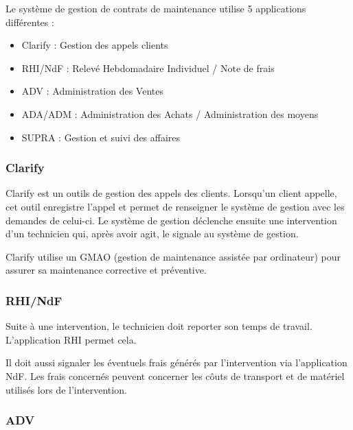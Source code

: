 Le système de gestion de contrats de maintenance utilise 5 applications différentes :


\begin{itemize}
\item Clarify : Gestion des appels clients
\item RHI/NdF : Relevé Hebdomadaire Individuel / Note de frais
\item ADV : Administration des Ventes
\item ADA/ADM : Administration des Achats / Administration des moyens
\item SUPRA : Gestion et suivi des affaires
\end{itemize}


\subsubsection{Clarify}

Clarify est un outils de gestion des appels des clients.
Lorsqu'un client appelle, cet outil enregistre l'appel et permet de renseigner le système de gestion avec les demandes de celui-ci.
Le système de gestion déclenche ensuite une intervention d'un technicien qui, après avoir agit, le signale au système de gestion.

Clarify utilise un GMAO (gestion de maintenance assistée par ordinateur) pour assurer sa maintenance corrective et préventive.


\subsubsection{RHI/NdF}

Suite à une intervention, le technicien doit reporter son temps de travail. L'application RHI permet cela.

Il doit aussi signaler les éventuels frais générés par l'intervention via l'application NdF.
Les frais concernés peuvent concerner les côuts de transport et de matériel utilisés lors de l'intervention.

\subsubsection{ADV}

